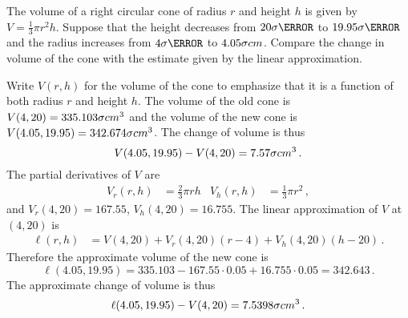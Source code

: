 \begin{question}
The volume of a right circular cone of radius $r$ and height $h$ is given by $V=\frac 13 \pi r^2 h$. Suppose that the height decreases from $20\six{\cm}$ to $19.95\six{\cm}$ and the radius increases from $4\six{\cm}$ to $4.05\six{cm}$. Compare the change in volume of the cone with the estimate given by the linear approximation.
\end{question}

\begin{solution}
Write $V(r,h)$ for the volume of the cone to emphasize that it is a function of both radius $r$ and height $h$. The volume of the old cone is $V(4,20) = 335.103\six{cm^3}$ and the volume of the new cone is $V(4.05,19.95) = 342.674\six{cm^3}$. The change of volume is thus
\[
V(4.05,19.95) - V(4,20) = 7.57\six{cm^3}\,.
\]
The partial derivatives of $V$ are
\begin{align*}
V_r(r,h) &= \frac 23 \pi r h &
V_h(r,h) &= \frac 13 \pi r^2\,,
\end{align*}
and $V_r(4,20) = 167.55$, $V_h(4,20) = 16.755$. The linear approximation of $V$ at $(4,20)$ is
\begin{align*}
\ell(r,h) &= V(4,20) + V_r(4,20)(r-4) + V_h(4,20)(h-20)\,.
\end{align*}
Therefore the approximate volume of the new cone is
\[
\ell(4.05,19.95) = 335.103 - 167.55 \cdot 0.05 + 16.755 \cdot 0.05 = 342.643\,.
\]
The approximate change of volume is thus
\[
\ell(4.05,19.95) - V(4,20) = 7.5398\six{cm^3}\,.
\]
\end{solution}



